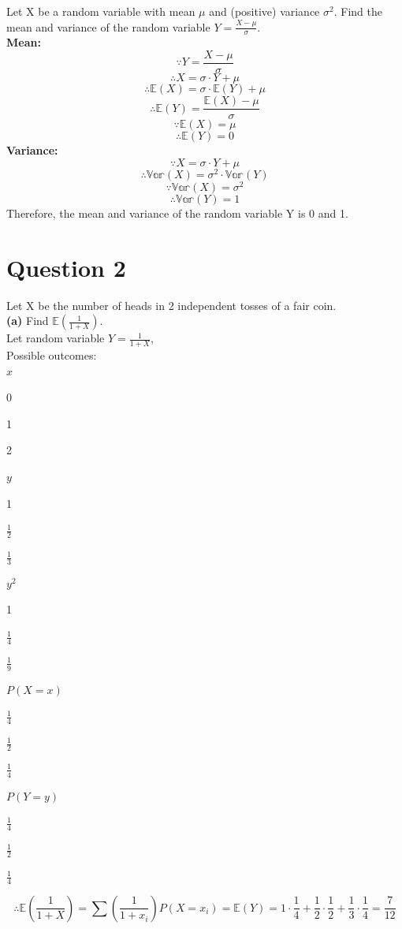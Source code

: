 \documentclass[
]{book}
\begin{document}
Let X be a random variable with mean \(\mu\) and (positive) variance \(\sigma^2\). Find the mean and variance of the random variable \(Y = \frac{X - \mu}{\sigma}\).\\
\textbf{Mean:}
\[\because Y = \frac{X - \mu}{\sigma}\]
\[\therefore X = \sigma \cdot Y + \mu\]
\[\therefore \mathbb{E}(X) = \sigma \cdot \mathbb{E}(Y) + \mu\]
\[\therefore \mathbb{E}(Y) = \frac{\mathbb{E}(X) - \mu}{\sigma}\]
\[\because \mathbb{E}(X) = \mu\]
\[\therefore \mathbb{E}(Y) = 0\]
\textbf{Variance:}
\[\because X = \sigma \cdot Y + \mu\]
\[\therefore \mathbb{Var}(X) = \sigma^2 \cdot \mathbb{Var}(Y)\]
\[\because \mathbb{Var}(X) = \sigma^2\]
\[\therefore \mathbb{Var}(Y) = 1\]
Therefore, the mean and variance of the random variable Y is 0 and 1.

\section{Question 2}\label{question-2-3}

Let X be the number of heads in 2 independent tosses of a fair coin.\\
\textbf{(a)} Find \(\mathbb{E}(\frac{1}{1+X})\).\\
Let random variable \(Y = \frac{1}{1+X}\),\\
Possible outcomes:\\

\(x\)

0

1

2

\(y\)

1

\(\frac{1}{2}\)

\(\frac{1}{3}\)

\(y^2\)

1

\(\frac{1}{4}\)

\(\frac{1}{9}\)

\(P(X=x)\)

\(\frac{1}{4}\)

\(\frac{1}{2}\)

\(\frac{1}{4}\)

\(P(Y=y)\)

\(\frac{1}{4}\)

\(\frac{1}{2}\)

\(\frac{1}{4}\)

\[\therefore \mathbb{E}(\frac{1}{1+X}) = \sum (\frac{1}{1+x_i})P(X = x_i) = \mathbb{E}(Y) = 1 \cdot \frac{1}{4} + \frac{1}{2} \cdot \frac{1}{2} + \frac{1}{3} \cdot \frac{1}{4} = \frac{7}{12}\]
\end{document}
